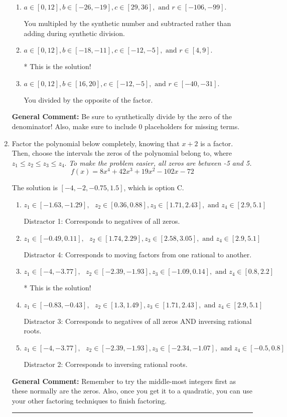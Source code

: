 \documentclass{extbook}[14pt]
\newcommand{\litem}[1]{\item #1

\rule{\textwidth}{0.4pt}}
\begin{document}
\begin{enumerate}
{\begin{enumerate}[label=\Alph*.]
 You multipled by the synthetic number rather than bringing the first factor down.
\item \( a \in [0, 12], b \in [-26, -19], c \in [29, 36], \text{ and } r \in [-106, -99]. \)

 You multipled by the synthetic number and subtracted rather than adding during synthetic division.
\item \( a \in [0, 12], b \in [-18, -11], c \in [-12, -5], \text{ and } r \in [4, 9]. \)

* This is the solution!
\item \( a \in [0, 12], b \in [16, 20], c \in [-12, -5], \text{ and } r \in [-40, -31]. \)

 You divided by the opposite of the factor.
\end{enumerate}

\textbf{General Comment:} Be sure to synthetically divide by the zero of the denominator! Also, make sure to include 0 placeholders for missing terms.
}
\litem{
Factor the polynomial below completely, knowing that $x+2$ is a factor. Then, choose the intervals the zeros of the polynomial belong to, where $z_1 \leq z_2 \leq z_3 \leq z_4$. \textit{To make the problem easier, all zeros are between -5 and 5.}
\[ f(x) = 8x^{4} +42 x^{3} +19 x^{2} -102 x -72 \]

The solution is \( [-4, -2, -0.75, 1.5] \), which is option C.\begin{enumerate}[label=\Alph*.]
\item \( z_1 \in [-1.63, -1.29], \text{   }  z_2 \in [0.36, 0.88], z_3 \in [1.71, 2.43], \text{   and   } z_4 \in [2.9, 5.1] \)

 Distractor 1: Corresponds to negatives of all zeros.
\item \( z_1 \in [-0.49, 0.11], \text{   }  z_2 \in [1.74, 2.29], z_3 \in [2.58, 3.05], \text{   and   } z_4 \in [2.9, 5.1] \)

 Distractor 4: Corresponds to moving factors from one rational to another.
\item \( z_1 \in [-4, -3.77], \text{   }  z_2 \in [-2.39, -1.93], z_3 \in [-1.09, 0.14], \text{   and   } z_4 \in [0.8, 2.2] \)

* This is the solution!
\item \( z_1 \in [-0.83, -0.43], \text{   }  z_2 \in [1.3, 1.49], z_3 \in [1.71, 2.43], \text{   and   } z_4 \in [2.9, 5.1] \)

 Distractor 3: Corresponds to negatives of all zeros AND inversing rational roots.
\item \( z_1 \in [-4, -3.77], \text{   }  z_2 \in [-2.39, -1.93], z_3 \in [-2.34, -1.07], \text{   and   } z_4 \in [-0.5, 0.8] \)

 Distractor 2: Corresponds to inversing rational roots.
\end{enumerate}

\textbf{General Comment:} Remember to try the middle-most integers first as these normally are the zeros. Also, once you get it to a quadratic, you can use your other factoring techniques to finish factoring.
}
\end{enumerate}
\end{document}
